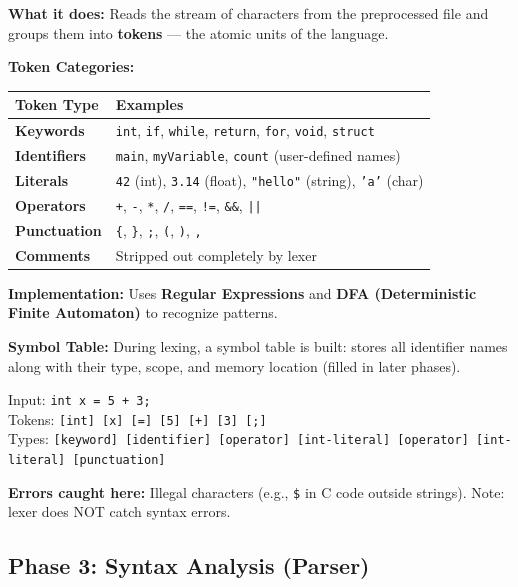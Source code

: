 \documentclass[11pt,a4paper]{article}
\newcommand{\code}[1]{\texttt{\small\colorbox{codebg}{\color{codekw}#1}}}
\newcommand{\term}[1]{\textbf{\color{darkblue}#1}}
\begin{document}
\textbf{What it does:} Reads the stream of characters from the preprocessed file and groups them into \term{tokens} --- the atomic units of the language.

\textbf{Token Categories:}
\begin{center}
\begin{tabular}{L{3.5cm} L{9.5cm}}
\toprule
\textbf{Token Type} & \textbf{Examples} \\
\midrule
\term{Keywords}      & \code{int}, \code{if}, \code{while}, \code{return}, \code{for}, \code{void}, \code{struct} \\
\term{Identifiers}   & \code{main}, \code{myVariable}, \code{count} (user-defined names) \\
\term{Literals}      & \code{42} (int), \code{3.14} (float), \code{"hello"} (string), \code{'a'} (char) \\
\term{Operators}     & \code{+}, \code{-}, \code{*}, \code{/}, \code{==}, \code{!=}, \code{\&\&}, \code{||} \\
\term{Punctuation}   & \code{\{}, \code{\}}, \code{;}, \code{(}, \code{)}, \code{,} \\
\term{Comments}      & Stripped out completely by lexer \\
\bottomrule
\end{tabular}
\end{center}

\textbf{Implementation:} Uses \term{Regular Expressions} and \term{DFA (Deterministic Finite Automaton)} to recognize patterns.

\textbf{Symbol Table:} During lexing, a symbol table is built: stores all identifier names along with their type, scope, and memory location (filled in later phases).

\begin{myexample}
Input: \code{int x = 5 + 3;}\\
Tokens: \code{[int] [x] [=] [5] [+] [3] [;]}\\
Types:  \code{[keyword] [identifier] [operator] [int-literal] [operator] [int-literal] [punctuation]}
\end{myexample}

\textbf{Errors caught here:} Illegal characters (e.g., \code{\$} in C code outside strings). Note: lexer does NOT catch syntax errors.

\subsection{Phase 3: Syntax Analysis (Parser)}
\end{document}
